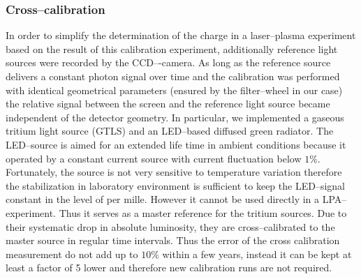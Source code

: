 \documentclass[%
preprint,
amsmath,
amssymb,
aip,
rsi, 
numerical,
floatfix,
]{revtex4-1}
\newcommand{\myCite}[1]{\textcolor{blue}{\cite{#1}}}
\begin{document}
\subsubsection{\label{Cc}Cross--calibration} 
In order to simplify the determination of the charge in a laser--plasma experiment based on the result of this calibration experiment, additionally reference light sources were recorded by the CCD–-camera. 
As long as the reference source delivers a constant photon signal over time and the calibration was performed with identical geometrical parameters (ensured by the filter--wheel in our case) the relative signal between the screen and the reference light source became independent of the detector geometry.
In particular, we implemented a gaseous tritium light source (GTLS) and an LED--based diffused green radiator.
The LED--source is aimed for an extended life time in ambient conditions because it operated by a constant current source with current fluctuation below $1\%$.
Fortunately, the source is not very sensitive to temperature variation therefore the stabilization in laboratory environment is sufficient to keep the LED--signal constant in the level of per mille.  
However it cannot be used directly in a LPA--experiment.
Thus it serves as a master reference for the tritium sources.
Due to their systematic drop in absolute luminosity\myCite{Buck2010}, they are cross--calibrated to the master source in regular time intervals.
Thus the error of the cross calibration measurement do not add up to $10\%$ within a few years, instead it can be kept at least a factor of 5 lower and therefore new calibration runs are not required.
\end{document}
